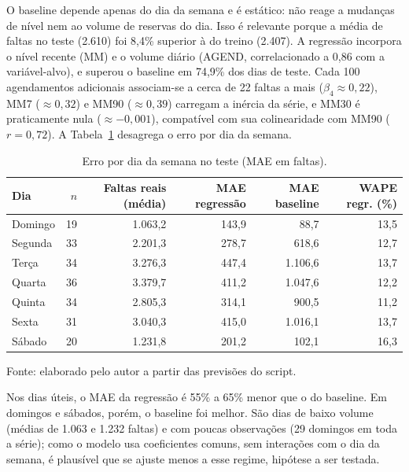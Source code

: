 \documentclass[11pt]{article}
\begin{document}
O baseline depende apenas do dia da semana e é estático: não reage a mudanças de nível nem ao volume de reservas do dia. Isso é relevante porque a média de faltas no teste (2.610) foi 8,4\% superior à do treino (2.407). A regressão incorpora o nível recente (MM) e o volume diário (AGEND, correlacionado a 0,86 com a variável-alvo), e superou o baseline em 74,9\% dos dias de teste. Cada 100 agendamentos adicionais associam-se a cerca de 22 faltas a mais ($\beta_4\approx 0,22$), MM7 ($\approx 0,32$) e MM90 ($\approx 0,39$) carregam a inércia da série, e MM30 é praticamente nula ($\approx -0,001$), compatível com sua colinearidade com MM90 ($r=0,72$). A Tabela~\ref{tab:dias} desagrega o erro por dia da semana.

\begin{table}[htbp]
\centering
\scriptsize
\caption{Erro por dia da semana no teste (MAE em faltas).}
\label{tab:dias}
\begin{tabular}{@{}lrrrrr@{}}
\toprule
Dia & $n$ & Faltas reais (média) & MAE regressão & MAE baseline & WAPE regr. (\%) \\
\midrule
Domingo & 19 & 1.063,2 & 143,9 & 88,7 & 13,5 \\
Segunda & 33 & 2.201,3 & 278,7 & 618,6 & 12,7 \\
Terça & 34 & 3.276,3 & 447,4 & 1.106,6 & 13,7 \\
Quarta & 36 & 3.379,7 & 411,2 & 1.047,6 & 12,2 \\
Quinta & 34 & 2.805,3 & 314,1 & 900,5 & 11,2 \\
Sexta & 31 & 3.040,3 & 415,0 & 1.016,1 & 13,7 \\
Sábado & 20 & 1.231,8 & 201,2 & 102,1 & 16,3 \\
\bottomrule
\end{tabular}
\begin{flushleft}\footnotesize Fonte: elaborado pelo autor a partir das previsões do script.\end{flushleft}
\end{table}

Nos dias úteis, o MAE da regressão é 55\% a 65\% menor que o do baseline. Em domingos e sábados, porém, o baseline foi melhor. São dias de baixo volume (médias de 1.063 e 1.232 faltas) e com poucas observações (29 domingos em toda a série); como o modelo usa coeficientes comuns, sem interações com o dia da semana, é plausível que se ajuste menos a esse regime, hipótese a ser testada.
\end{document}
